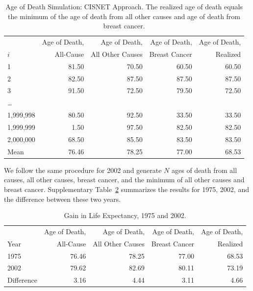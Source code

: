 \documentclass[11pt,letterpaper]{article}
\theoremstyle{plain}
\begin{document}
  \begin{table}[htbp]
    \centering
    \begin{tabular}{lrrrr}
      \toprule
              & Age of Death, & Age of Death, & Age of Death, & Age of Death,\\
      $i$   & All-Cause  & All Other Causes & Breast Cancer & Realized\\
              \midrule 
 1& 81.50 & 70.50 & 60.50 & 60.50 \\ 
  2 & 82.50 & 87.50 & 87.50 & 87.50 \\ 
  3 & 91.50 & 72.50 & 79.50 & 72.50 \\ 
\dots &  &  &  &  \\ 
 1,999,998 & 80.50 & 92.50 & 33.50 & 33.50 \\ 
  1,999,999 & 1.50 & 97.50 & 82.50 & 82.50 \\ 
  2,000,000 & 68.50 & 85.50 & 83.50 & 83.50 \\ 
\midrule
  Mean & 76.46 & 78.25 & 77.00 & 68.53 \\ 
\bottomrule
    \end{tabular}
\caption{Age of Death Simulation: CISNET Approach.  The realized age
  of death equals the minimum of the age of death from all other
  causes and age of death from breast cancer.}
\label{tb:agedeath75}
\end{table}

We follow the same procedure for 2002 and generate $N$ ages of death
from all causes, all other causes, breast cancer, and the minimum of
all other causes and breast cancer.  Supplementary
Table~\ref{tb:agedeath.summary} summarizes the results for 1975, 2002,
and the difference between these two years.

   \begin{table}[htbp]
  \centering 
   \begin{tabular}{lrrrr}
      \toprule
              & Age of Death, & Age of Death, & Age of Death, & Age of Death,\\
      Year   & All-Cause  & All Other Causes & Breast Cancer & Realized\\
              \midrule 
1975 & 76.46 & 78.25 & 77.00 & 68.53 \\ 
  2002 & 79.62 & 82.69 & 80.11 & 73.19 \\ 
 \midrule
 Difference & 3.16 & 4.44 & 3.11 & 4.66 \\ 
\bottomrule
    \end{tabular}
\caption{Gain in Life Expectancy, 1975 and 2002.}
\label{tb:agedeath.summary}
\end{table}
\end{document}
